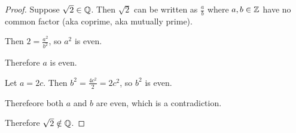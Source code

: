 \begin{proof}
  Suppose $\sqrt{2} \in \mathbb{Q}$. Then $\sqrt{2}$ can be written as $\frac{a}{b}$ where $a, b \in \mathbb{Z}$
  have no common factor (aka coprime, aka mutually prime).

  Then $2 = \frac{a^2}{b^2}$, so $a^2$ is even.

  Therefore $a$ is even.

  Let $a = 2c$. Then $b^2 = \frac{4c^2}{2} = 2c^2$, so $b^2$ is even.

  Therefeore both $a$ and $b$ are even, which is a contradiction.

  Therefore $\sqrt{2} \notin \mathbb{Q}$.
\end{proof}


